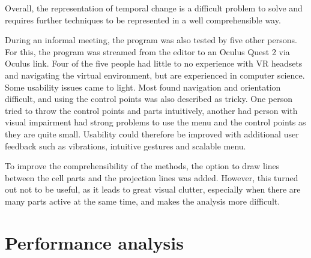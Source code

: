 Overall, the representation of temporal change is a difficult problem to solve and requires further techniques to be represented in a well comprehensible way.

During an informal meeting, the program was also tested by five other persons. For this, the program was streamed from the editor to an Oculus Quest 2 via Oculus link. Four of the five people had little to no experience with VR headsets and navigating the virtual environment, but are experienced in computer science. Some usability issues came to light. Most found navigation and orientation difficult, and using the control points was also described as tricky. One person tried to throw the control points and parts intuitively, another had person with visual impairment had strong problems to use the menu and the control points as they are quite small. Usability could therefore be improved with additional user feedback such as vibrations, intuitive gestures and scalable menu.

To improve the comprehensibility of the methods, the option to draw lines between the cell parts and the projection lines was added. However, this turned out not to be useful, as it leads to great visual clutter, especially when there are many parts active at the same time, and makes the analysis more difficult.

\section{Performance analysis}


